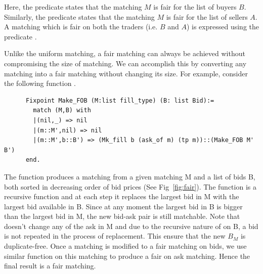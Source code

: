 \documentclass[a4paper,UKenglish,cleveref, autoref]{lipics-v2019}
\begin{document}
\begin{definition}
 \end{definition}
\begin{definition}
\end{definition}
\begin{definition}
\end{definition}

Here, the predicate   states that the matching $M$  is fair for the list of buyers $B$. Similarly,  the predicate  states that the matching $M$  is fair for the list of sellers $A$.  A matching which is fair on both the traders (i.e. $B$ and $A$) is expressed using the predicate .

Unlike the uniform matching, a fair matching can always be achieved without compromising the size of matching. We can accomplish this by converting any matching into a fair matching without changing its size. For example, consider the following function .

\begin{verbatim}
	  Fixpoint Make_FOB (M:list fill_type) (B: list Bid):=
	    match (M,B) with 
	    |(nil,_) => nil
	    |(m::M',nil) => nil
	    |(m::M',b::B') => (Mk_fill b (ask_of m) (tp m))::(Make_FOB M' B')
	  end.
\end{verbatim}

The function  produces a  matching from a given matching M and a list of bids B, both sorted in decreasing order of bid prices (See Fig~\ref{fig:fair}). The function  is a recursive function and  at each step it replaces the largest bid in M with the largest bid available in B. Since at any moment the largest bid in B is bigger than the largest bid in M, the new bid-ask pair is still matchable. Note that  doesn't change any of the ask in M and due to the recursive nature of  on B, a bid is not repeated in the process of replacement.  This ensure that the new $B_M$ is duplicate-free. Once a matching is modified to a fair matching on bids, we use similar function  on this matching to produce a fair on ask matching. Hence the final result is a fair matching. 
\end{document}

